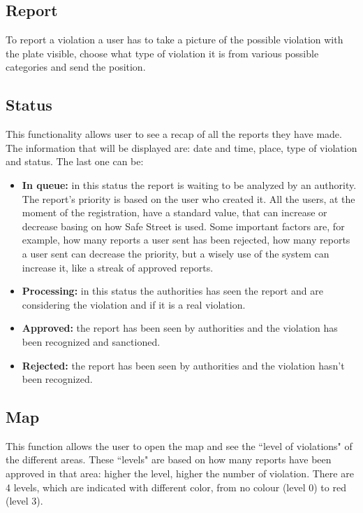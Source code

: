 \documentclass[12pt,a4paper]{report}
\begin{document}
		\subsection{Report}
			To report a violation a user has to take a picture of the possible violation with the plate visible, choose what type of
			violation it is from various possible categories and send the position.
		\subsection{Status}
			This functionality allows user to see a recap of all the reports they have made. The information that will be displayed
			are: date and time, place, type of violation and status. The last one can be:
			\begin{itemize}
				\item \textbf{In queue:}
					in this status the report is waiting to be analyzed by an authority. The report's priority is based on
					the user who created it. All the users, at the moment of the registration, have a standard value, that can increase or decrease basing on	how Safe Street is used. Some important factors are, for example, 
					how many reports a user sent has been rejected, how many reports a user sent can decrease
					the priority, but a wisely use of the system can increase it, like a streak of approved reports.
				\item \textbf{Processing:}
					in this status the authorities has seen the report and are considering the violation and if it is a real
					violation.
				\item \textbf{Approved:}
					the report has been seen by authorities and the violation has been recognized and sanctioned. 
				\item \textbf{Rejected:}
					the report has been seen by authorities and the violation hasn't been recognized.
			\end{itemize}
		\subsection{Map}
			This function allows the user to open the map and see the ``level of violations" of the different areas. These ``levels" are
			based on how many reports have been approved in that area: higher the level, higher the number of violation.
			There are 4 levels, which are indicated with different color, from no colour (level 0) to red (level 3).
			
\end{document}
